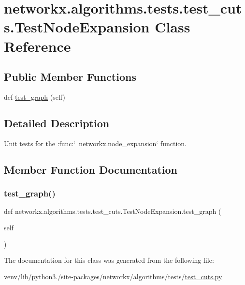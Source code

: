 \hypertarget{classnetworkx_1_1algorithms_1_1tests_1_1test__cuts_1_1TestNodeExpansion}{}\section{networkx.\+algorithms.\+tests.\+test\+\_\+cuts.\+Test\+Node\+Expansion Class Reference}
\label{classnetworkx_1_1algorithms_1_1tests_1_1test__cuts_1_1TestNodeExpansion}
\subsection*{Public Member Functions}
\begin{DoxyCompactItemize}
\item 
def \hyperlink{classnetworkx_1_1algorithms_1_1tests_1_1test__cuts_1_1TestNodeExpansion_aae99188eb0d8caf87752ae39bac4552c}{test\+\_\+graph} (self)
\end{DoxyCompactItemize}


\subsection{Detailed Description}
\begin{DoxyVerb}Unit tests for the :func:`~networkx.node_expansion` function.\end{DoxyVerb}
 

\subsection{Member Function Documentation}
\mbox{\label{classnetworkx_1_1algorithms_1_1tests_1_1test__cuts_1_1TestNodeExpansion_aae99188eb0d8caf87752ae39bac4552c}} 
\subsubsection{\texorpdfstring{test\+\_\+graph()}{test\_graph()}}
{\footnotesize\ttfamily def networkx.\+algorithms.\+tests.\+test\+\_\+cuts.\+Test\+Node\+Expansion.\+test\+\_\+graph (\begin{DoxyParamCaption}\item[{}]{self }\end{DoxyParamCaption})}



The documentation for this class was generated from the following file\+:\begin{DoxyCompactItemize}
\item 
venv/lib/python3./site-\/packages/networkx/algorithms/tests/\hyperlink{tests_2test__cuts_8py}{test\+\_\+cuts.\+py}\end{DoxyCompactItemize}
